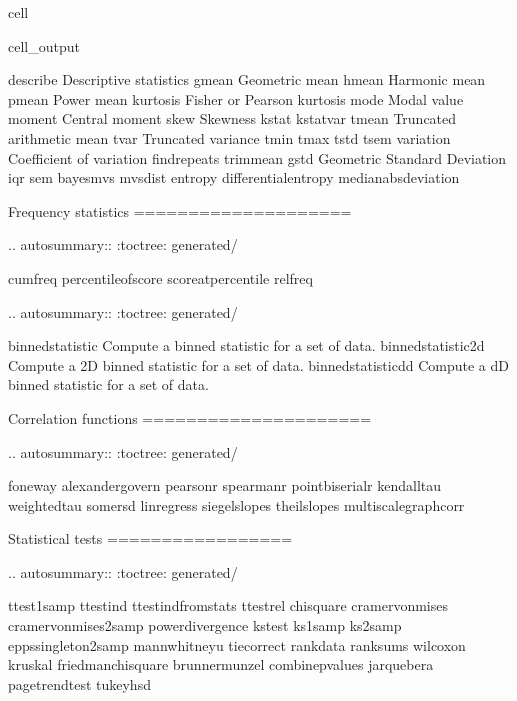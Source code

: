 \documentclass[letterpaper,10pt,english]{jupyterBook}
\begin{document}
\begin{sphinxuseclass}{cell}
\begin{sphinxVerbatimOutput}
\begin{sphinxuseclass}{cell_output}
\begin{sphinxVerbatim}[commandchars=\\\{\}]
   describe          \PYGZhy{}\PYGZhy{} Descriptive statistics
   gmean             \PYGZhy{}\PYGZhy{} Geometric mean
   hmean             \PYGZhy{}\PYGZhy{} Harmonic mean
   pmean             \PYGZhy{}\PYGZhy{} Power mean
   kurtosis          \PYGZhy{}\PYGZhy{} Fisher or Pearson kurtosis
   mode              \PYGZhy{}\PYGZhy{} Modal value
   moment            \PYGZhy{}\PYGZhy{} Central moment
   skew              \PYGZhy{}\PYGZhy{} Skewness
   kstat             \PYGZhy{}\PYGZhy{}
   kstatvar          \PYGZhy{}\PYGZhy{}
   tmean             \PYGZhy{}\PYGZhy{} Truncated arithmetic mean
   tvar              \PYGZhy{}\PYGZhy{} Truncated variance
   tmin              \PYGZhy{}\PYGZhy{}
   tmax              \PYGZhy{}\PYGZhy{}
   tstd              \PYGZhy{}\PYGZhy{}
   tsem              \PYGZhy{}\PYGZhy{}
   variation         \PYGZhy{}\PYGZhy{} Coefficient of variation
   find\PYGZus{}repeats
   trim\PYGZus{}mean
   gstd              \PYGZhy{}\PYGZhy{} Geometric Standard Deviation
   iqr
   sem
   bayes\PYGZus{}mvs
   mvsdist
   entropy
   differential\PYGZus{}entropy
   median\PYGZus{}abs\PYGZus{}deviation

Frequency statistics
====================

.. autosummary::
   :toctree: generated/

   cumfreq
   percentileofscore
   scoreatpercentile
   relfreq

.. autosummary::
   :toctree: generated/

   binned\PYGZus{}statistic     \PYGZhy{}\PYGZhy{} Compute a binned statistic for a set of data.
   binned\PYGZus{}statistic\PYGZus{}2d  \PYGZhy{}\PYGZhy{} Compute a 2\PYGZhy{}D binned statistic for a set of data.
   binned\PYGZus{}statistic\PYGZus{}dd  \PYGZhy{}\PYGZhy{} Compute a d\PYGZhy{}D binned statistic for a set of data.

Correlation functions
=====================

.. autosummary::
   :toctree: generated/

   f\PYGZus{}oneway
   alexandergovern
   pearsonr
   spearmanr
   pointbiserialr
   kendalltau
   weightedtau
   somersd
   linregress
   siegelslopes
   theilslopes
   multiscale\PYGZus{}graphcorr

Statistical tests
=================

.. autosummary::
   :toctree: generated/

   ttest\PYGZus{}1samp
   ttest\PYGZus{}ind
   ttest\PYGZus{}ind\PYGZus{}from\PYGZus{}stats
   ttest\PYGZus{}rel
   chisquare
   cramervonmises
   cramervonmises\PYGZus{}2samp
   power\PYGZus{}divergence
   kstest
   ks\PYGZus{}1samp
   ks\PYGZus{}2samp
   epps\PYGZus{}singleton\PYGZus{}2samp
   mannwhitneyu
   tiecorrect
   rankdata
   ranksums
   wilcoxon
   kruskal
   friedmanchisquare
   brunnermunzel
   combine\PYGZus{}pvalues
   jarque\PYGZus{}bera
   page\PYGZus{}trend\PYGZus{}test
   tukey\PYGZus{}hsd


\end{sphinxVerbatim}
\end{sphinxuseclass}
\end{sphinxVerbatimOutput}
\end{sphinxuseclass}
\end{document}
